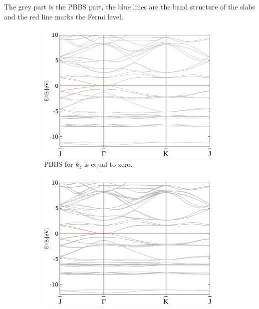 	The grey part is the PBBS part, the blue lines are the band structure of the slabs and the red line marks the Fermi level.  	
	\begin{figure}[htbp]
		\begin{subfigure}[c]{.48\linewidth}
			\centering
			\includegraphics[width=\linewidth]{andere_bilder/0_bulk_-12_10.pdf}
			\caption{PBBS for $k_z$ is equal to zero.}
			\vspace{14pt}
		\end{subfigure}
		\hfill
		\begin{subfigure}[c]{.48\linewidth}
			\centering
			\includegraphics[width=\linewidth]{andere_bilder/4_bulk_-12_10.pdf}

\end{subfigure}
\end{figure}
